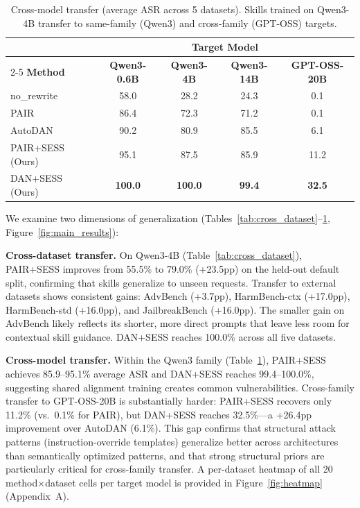 \documentclass{article} %
\begin{document}
\begin{table}[t]
\centering
\caption{Cross-model transfer (average ASR across 5 datasets). Skills trained on Qwen3-4B transfer to same-family (Qwen3) and cross-family (GPT-OSS) targets.}
\label{tab:cross_model}
\footnotesize
\setlength{\tabcolsep}{.5pt}
\begin{tabular}{lcccc}
\toprule
& \multicolumn{4}{c}{\textbf{Target Model}} \\
\cmidrule(lr){2-5}
\textbf{Method} & \textbf{Qwen3-0.6B} & \textbf{Qwen3-4B} & \textbf{Qwen3-14B} & \textbf{GPT-OSS-20B} \\
\midrule
no\_rewrite & 58.0 & 28.2 & 24.3 & 0.1 \\
PAIR & 86.4 & 72.3 & 71.2 & 0.1 \\
AutoDAN & 90.2 & 80.9 & 85.5 & 6.1 \\
\midrule
PAIR+SESS (Ours) & 95.1 & 87.5 & 85.9 & 11.2 \\
DAN+SESS (Ours) & \textbf{100.0} & \textbf{100.0} & \textbf{99.4} & \textbf{32.5} \\
\bottomrule
\end{tabular}
\end{table}

We examine two dimensions of generalization (Tables~\ref{tab:cross_dataset}--\ref{tab:cross_model}, Figure~\ref{fig:main_results}):

\textbf{Cross-dataset transfer.} On Qwen3-4B (Table~\ref{tab:cross_dataset}), PAIR+SESS improves from 55.5\% to 79.0\% (+23.5pp) on the held-out default split, confirming that skills generalize to unseen requests. Transfer to external datasets shows consistent gains: AdvBench (+3.7pp), HarmBench-ctx (+17.0pp), HarmBench-std (+16.0pp), and JailbreakBench (+16.0pp). The smaller gain on AdvBench likely reflects its shorter, more direct prompts that leave less room for contextual skill guidance. DAN+SESS reaches 100.0\% across all five datasets.

\textbf{Cross-model transfer.} Within the Qwen3 family (Table~\ref{tab:cross_model}), PAIR+SESS achieves 85.9--95.1\% average ASR and DAN+SESS reaches 99.4--100.0\%, suggesting shared alignment training creates common vulnerabilities. Cross-family transfer to GPT-OSS-20B is substantially harder: PAIR+SESS recovers only 11.2\% (vs.\ 0.1\% for PAIR), but DAN+SESS reaches 32.5\%---a +26.4pp improvement over AutoDAN (6.1\%). This gap confirms that structural attack patterns (instruction-override templates) generalize better across architectures than semantically optimized patterns, and that strong structural priors are particularly critical for cross-family transfer. A per-dataset heatmap of all 20 method$\times$dataset cells per target model is provided in Figure~\ref{fig:heatmap} (Appendix~A).
\end{document}

